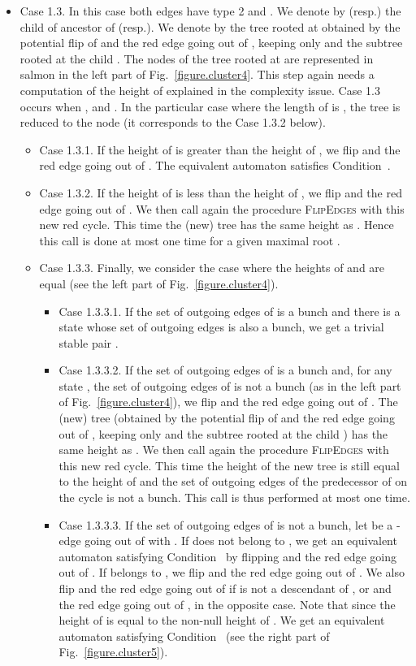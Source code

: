 \documentclass[11pt,a4paper]{article}
\newcommand{\resp}{{resp.}\xspace }
\begin{document}
\begin{itemize}
\begin{itemize}
\item Case 1.3. In this case both edges  have type 2 and .  We denote by  (\resp ) the child of  ancestor
  of  (\resp ).  We denote by  the tree rooted at 
  obtained by the potential flip of  and the red edge
  going out of , keeping only  and the subtree rooted at the
  child . The nodes of the tree  rooted at  are
  represented in salmon in the left part of
  Fig.~\ref{figure.cluster4}.  This step again needs a computation of
  the height of  explained in the complexity issue. Case 1.3
  occurs when ,  and .  In the particular case
  where the length of  is , the tree  is reduced to the node
   (it corresponds to the Case 1.3.2 below).
\begin{itemize}
\item Case 1.3.1. If the height of  is greater than the height of ,
  we flip  and the red edge going out of
  . The equivalent automaton satisfies
  Condition~. 
\item Case 1.3.2. If the height of  is less than the height of
  , we flip  and the red edge going
  out of . We then call again the procedure
  \textsc{FlipEdges} with this new red cycle. This time the
  (new) tree  has the same height as .  Hence this
  call is done at most one time for a given maximal root . 
\item Case 1.3.3. Finally, we consider the case where the heights of  and
 are equal (see the left part of Fig.~\ref{figure.cluster4}).
\begin{itemize}
\item Case 1.3.3.1.
If the set of outgoing edges of  is a bunch and there is a state
 whose set of outgoing edges is also a
bunch, we get a trivial stable pair . 
\item Case 1.3.3.2.  If the set of outgoing edges of  is a bunch
  and, for any state , the set of outgoing edges of  is
  not a bunch (as in the left part of Fig.~\ref{figure.cluster4}), we
  flip  and the red edge going out of . The (new)
  tree  (obtained by the potential flip of  and
  the red edge going out of , keeping only  and the subtree
  rooted at the child ) has the same height as .  We then
  call again the procedure \textsc{FlipEdges} with this new
  red cycle. This time the height of the new tree  is still
  equal to the height of  and the set of outgoing edges of the
  predecessor of  on the cycle is not a bunch. This call is thus
  performed at most one time.
\item Case 1.3.3.3.
If the set of outgoing edges of  is not a bunch, let
 be a -edge going out of  with .
If  does not belong to , we get an equivalent automaton
satisfying Condition~ by flipping  and the red edge
going out of . If  belongs to , we flip 
and the red edge going out of . We also flip  and
the red edge going out of  if  is not a descendant of ,
or  and the red edge going out of , in the opposite
case. Note that  since the height of  is equal to
the non-null height of . We get an equivalent automaton satisfying
Condition~ (see the right part of Fig.~\ref{figure.cluster5}).
\end{itemize}
\end{itemize}
\end{itemize}




\end{itemize}
\end{document}
